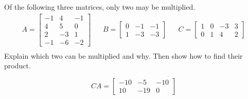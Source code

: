 
\begin{exerciseStatement}


Of the following three matrices, only two may be multiplied. 
\begin{align*} A= \left[\begin{array}{ccc}
-1 & 4 & -1 \\
4 & 5 & 0 \\
2 & -3 & 1 \\
-1 & -6 & -2
\end{array}\right]  & & B= \left[\begin{array}{ccc}
0 & -1 & -1 \\
1 & -3 & -3
\end{array}\right]  & & C= \left[\begin{array}{cccc}
1 & 0 & -3 & 3 \\
0 & 1 & 4 & 2
\end{array}\right]  \\ \end{align*}
             Explain which two can be multiplied and why. Then show how to find their product.


\end{exerciseStatement}
    
\begin{exerciseAnswer} 
\[CA= \left[\begin{array}{ccc}
-10 & -5 & -10 \\
10 & -19 & 0
\end{array}\right] \]
\end{exerciseAnswer}
    
